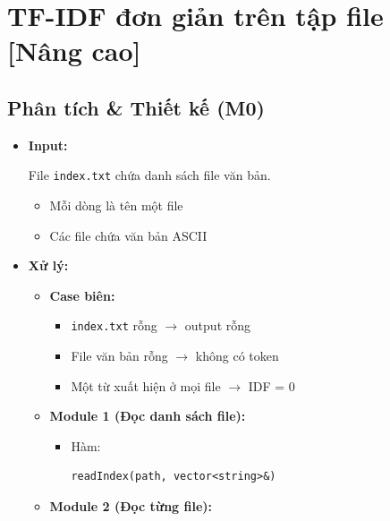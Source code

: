 \section{TF-IDF đơn giản trên tập file [Nâng cao]}
\subsection{Phân tích \& Thiết kế (M0)}

\begin{itemize}

    \item \textbf{Input:}

    File \texttt{index.txt} chứa danh sách file văn bản.

    \begin{itemize}
        \item Mỗi dòng là tên một file
        \item Các file chứa văn bản ASCII
    \end{itemize}

    \item \textbf{Xử lý:}

    \begin{itemize}

        \item \textbf{Case biên:}

        \begin{itemize}
            \item \texttt{index.txt} rỗng
            $\rightarrow$
            output rỗng
            \item File văn bản rỗng
            $\rightarrow$
            không có token
            \item Một từ xuất hiện ở mọi file
            $\rightarrow$
            IDF = 0
        \end{itemize}

        \item \textbf{Module 1 (Đọc danh sách file):}

        \begin{itemize}
            \item Hàm:
\begin{lstlisting}
readIndex(path, vector<string>&)
\end{lstlisting}
        \end{itemize}

        \item \textbf{Module 2 (Đọc từng file):}


\end{itemize}
\end{itemize}
